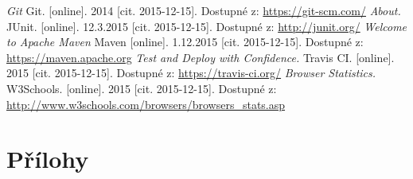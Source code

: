 \documentclass[
    color,   %
	table,   %
    twoside, %
    nolot, nolof
]{fithesis3}
\begin{document}
\begin{thebibliography}{9}
\emph{Git} Git. [online]. 2014 [cit. 2015-12-15]. Dostupné z: \url{https://git-scm.com/}
\emph{About.} JUnit. [online]. 12.3.2015 [cit. 2015-12-15]. Dostupné z: \url{http://junit.org/}
\emph{Welcome to Apache Maven} Maven [online]. 1.12.2015 [cit. 2015-12-15]. Dostupné z: \url{https://maven.apache.org}
\emph{Test and Deploy with Confidence.} Travis CI. [online]. 2015 [cit. 2015-12-15]. Dostupné z: \url{https://travis-ci.org/}
\emph{Browser Statistics.} W3Schools. [online]. 2015 [cit. 2015-12-15]. Dostupné z: \url{http://www.w3schools.com/browsers/browsers_stats.asp}
\end{thebibliography}

\chapter{Přílohy}
\end{document}
